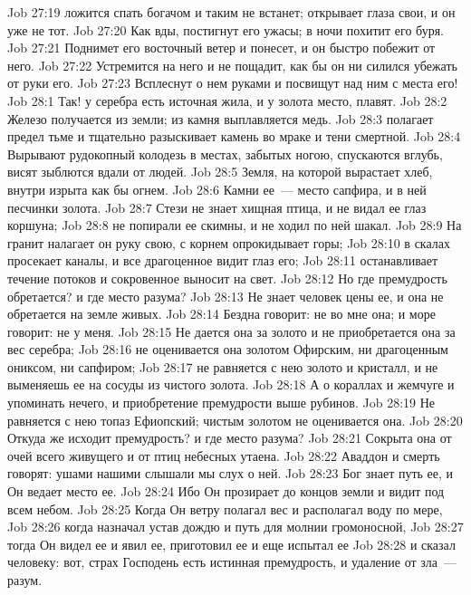 \vs Job 27:19 ложится спать богачом и таким не встанет; открывает глаза свои, и он уже не тот.
\vs Job 27:20 Как вды, постигнут его ужасы; в ночи похитит его буря.
\vs Job 27:21 Поднимет его восточный ветер и понесет, и он быстро побежит от него.
\vs Job 27:22 Устремится на него и не пощадит, как бы он ни силился убежать от руки его.
\vs Job 27:23 Всплеснут о нем руками и посвищут над ним с места его!
\vs Job 28:1 Так! у серебра есть источная жила, и у золота место,  плавят.
\vs Job 28:2 Железо получается из земли; из камня выплавляется медь.
\vs Job 28:3  полагает предел тьме и тщательно разыскивает камень во мраке и тени смертной.
\vs Job 28:4 Вырывают рудокопный колодезь в местах, забытых ногою, спускаются вглубь, висят  зыблются вдали от людей.
\vs Job 28:5 Земля, на которой вырастает хлеб, внутри изрыта как бы огнем.
\vs Job 28:6 Камни ее~--- место сапфира, и в ней песчинки золота.
\vs Job 28:7 Стези  не знает хищная птица, и не видал ее глаз коршуна;
\vs Job 28:8 не попирали ее скимны, и не ходил по ней шакал.
\vs Job 28:9 На гранит налагает он руку свою, с корнем опрокидывает горы;
\vs Job 28:10 в скалах просекает каналы, и все драгоценное видит глаз его;
\vs Job 28:11 останавливает течение потоков и сокровенное выносит на свет.
\vs Job 28:12 Но где премудрость обретается? и где место разума?
\vs Job 28:13 Не знает человек цены ее, и она не обретается на земле живых.
\vs Job 28:14 Бездна говорит: не во мне она; и море говорит: не у меня.
\vs Job 28:15 Не дается она за золото и не приобретается она за вес серебра;
\vs Job 28:16 не оценивается она золотом Офирским, ни драгоценным ониксом, ни сапфиром;
\vs Job 28:17 не равняется с нею золото и кристалл, и не выменяешь ее на сосуды из чистого золота.
\vs Job 28:18 А о кораллах и жемчуге и упоминать нечего, и приобретение премудрости выше рубинов.
\vs Job 28:19 Не равняется с нею топаз Ефиопский; чистым золотом не оценивается она.
\vs Job 28:20 Откуда же исходит премудрость? и где место разума?
\vs Job 28:21 Сокрыта она от очей всего живущего и от птиц небесных утаена.
\vs Job 28:22 Аваддон и смерть говорят: ушами нашими слышали мы слух о ней.
\vs Job 28:23 Бог знает путь ее, и Он ведает место ее.
\vs Job 28:24 Ибо Он прозирает до концов земли и видит под всем небом.
\vs Job 28:25 Когда Он ветру полагал вес и располагал воду по мере,
\vs Job 28:26 когда назначал устав дождю и путь для молнии громоносной,
\vs Job 28:27 тогда Он видел ее и явил ее, приготовил ее и еще испытал ее
\vs Job 28:28 и сказал человеку: вот, страх Господень есть истинная премудрость, и удаление от зла~--- разум.
